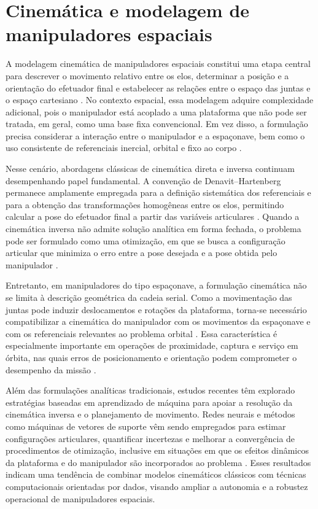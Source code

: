 \section{Cinemática e modelagem de manipuladores espaciais}

A modelagem cinemática de manipuladores espaciais constitui uma etapa central para descrever o movimento relativo entre os elos, determinar a posição e a orientação do efetuador final e estabelecer as relações entre o espaço das juntas e o espaço cartesiano \cite{fonseca2019kinematics}. No contexto espacial, essa modelagem adquire complexidade adicional, pois o manipulador está acoplado a uma plataforma que não pode ser tratada, em geral, como uma base fixa convencional. Em vez disso, a formulação precisa considerar a interação entre o manipulador e a espaçonave, bem como o uso consistente de referenciais inercial, orbital e fixo ao corpo \cite{fonseca2019kinematics,fonseca2016dynamics}.

Nesse cenário, abordagens clássicas de cinemática direta e inversa continuam desempenhando papel fundamental. A convenção de Denavit--Hartenberg permanece amplamente empregada para a definição sistemática dos referenciais e para a obtenção das transformações homogêneas entre os elos, permitindo calcular a pose do efetuador final a partir das variáveis articulares \cite{fonseca2019kinematics}. Quando a cinemática inversa não admite solução analítica em forma fechada, o problema pode ser formulado como uma otimização, em que se busca a configuração articular que minimiza o erro entre a pose desejada e a pose obtida pelo manipulador \cite{santos2022uncertainty,santos2023physics}.

Entretanto, em manipuladores do tipo espaçonave, a formulação cinemática não se limita à descrição geométrica da cadeia serial. Como a movimentação das juntas pode induzir deslocamentos e rotações da plataforma, torna-se necessário compatibilizar a cinemática do manipulador com os movimentos da espaçonave e com os referenciais relevantes ao problema orbital \cite{fonseca2019kinematics,fonseca2016dynamics}. Essa característica é especialmente importante em operações de proximidade, captura e serviço em órbita, nas quais erros de posicionamento e orientação podem comprometer o desempenho da missão \cite{arantes2010far,fonseca2016dynamics}.

Além das formulações analíticas tradicionais, estudos recentes têm explorado estratégias baseadas em aprendizado de máquina para apoiar a resolução da cinemática inversa e o planejamento de movimento. Redes neurais e métodos como máquinas de vetores de suporte vêm sendo empregados para estimar configurações articulares, quantificar incertezas e melhorar a convergência de procedimentos de otimização, inclusive em situações em que os efeitos dinâmicos da plataforma e do manipulador são incorporados ao problema \cite{santos2022uncertainty,santos2023physics,santos2022machine}. Esses resultados indicam uma tendência de combinar modelos cinemáticos clássicos com técnicas computacionais orientadas por dados, visando ampliar a autonomia e a robustez operacional de manipuladores espaciais.

